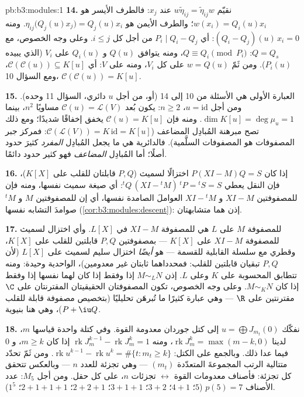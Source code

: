 \begin{solution}{pb:b3:modules:1}
\textbf{14.} نقيّم $w\tilde\eta_{ij} = \tilde\eta_{ij}w$ عند $x_j$: فالطرف الأيسر هو $w(x_i) = Q_i(u)x_i$؛
والطرف الأيمن هو $\eta_{ij}\bigl(Q_j(u)x_j\bigr) = Q_j(u)x_i$. ومنه $(Q_i -
Q_j)(u)\,x_i = 0$: أي $P_i \mid Q_i - Q_j$ من أجل كل
$i \leq j$. وعلى وجه الخصوص، مع $Q = Q_s$: $Q \equiv Q_i \pmod{P_i}$، ومنه
يتوافق $Q(u)$ و $Q_i(u)$ على $V_i$ (الذي يبيده $P_i(u)$).
ومن ثَمّ $w
= Q(u)$ على كل $V_i$، ومنه على $V$: أي $\mathcal C(\mathcal C(u))
\subseteq K[u]$، ومع
السؤال 10، $\mathcal C(\mathcal
C(u)) = K[u]$.

\textbf{15.} العبارة الأولى هي الأسئلة من 10 إلى 14 (أو، من أجل
$u$ دائري، السؤال 11 وحده). ومن أجل $u = \mathrm{id}$، $n \geq
2$: يكون
بُعد $\mathcal C(u) = \mathcal L(V)$ مساويًا $n^2$، بينما $\dim K[u] = \deg\mu_u = 1$. ومنه فإن $\mathcal C(u) = K[u]$
يخفق إخفاقًا شديدًا؛ ومع ذلك تصح مبرهنة المُبادِل المضاعف
($\mathcal C(\mathcal L(V)) = K\,\mathrm{id} = K[u]$: فمركز جبر المصفوفات هو المصفوفات السلَّمية). فالدائرية
هي ما يجعل المُبادِل \emph{المفرد} كثيرَ حدود أصلًا؛ أما
المُبادِل \emph{المضاعف} فهو كثير حدود دائمًا.

\textbf{16.} إذا كان $P(XI - M)Q = S$ اختزالًا لسميث ($P, Q$
قابلتان للقلب على $K[X]$)، فإن النقل يعطي ${}^tQ\,(XI -
{}^tM)\,{}^tP = {}^tS = S$: أي صيغة سميث
نفسها، ومنه فإن للمصفوفتين $XI - M$ و $XI - {}^tM$ العواملَ
الصامدة نفسها، أي إن للمصفوفتين $M$ و ${}^tM$ صوامدَ التشابه
نفسها (\cref{cor:b3:modules:descent}): إذن هما متشابهتان.

\textbf{17.}  للمصفوفة $M$ على $L$ هي  للمصفوفة $XI - M$ في $L[X]$. وأي اختزال لسميث للمصفوفة
$XI - M$ على $K[X]$ --- بمصفوفتين $P, Q$ قابلتين للقلب على
$K[X]$، وقطري مع سلسلة القابلية للقسمة --- هو \emph{أيضًا}
اختزال سليم لسميث على $L[X]$ (لأن $P, Q$ تبقيان قابلتين للقلب:
فمحدداهما ثابتان غير معدومين)،  الواحدية وحيدة:
ومنه تتطابق  المحسوبة على $K$ وعلى $L$. إذن
$M \sim_L N$ إذا وفقط إذا كان لهما  نفسها إذا
وفقط إذا كان $M \sim_K N$. وعلى وجه الخصوص، تكون المصفوفتان
الحقيقيتان المقترنتان على $\C$ مقترنتين على $\R$ --- وهي عبارة
كثيرًا ما تُبرهَن تحليليًا (بتخصيص مصفوفة قابلة للقلب $P + \iu
Q$)،
وهي هنا بنيوية.

\textbf{18.} نفكّك $u = \bigoplus J_{m_t}(0)$ إلى كتل جوردان معدومة القوة. وفي كتلة
واحدة قياسها $m$، لدينا $\operatorname{rk}J_m^k = \max(m - k, 0)$، ومنه $\operatorname{rk}J_m^{k-1} - \operatorname{rk}J_m^k = 1$ إذا كان $m
\geq k$،
و $0$ فيما عدا ذلك. وبالجمع على الكتل: $\operatorname{rk}u^{k-1} - \operatorname{rk}u^k =
\#\{t : m_t \geq k\}$. ومن ثَمّ تحدّد
متتالية الرتب المجموعةَ المتعدّدة $(m_t)$ --- وهي تجزئة للعدد
$n$ --- وبالعكس تتحقق كل تجزئة: فأصناف معدومات القوة $\leftrightarrow$
تجزئات $n$، على كل حقل. ومن أجل $M_5$: عدد الأصناف $p(5) = 7$
($5$؛ $4{+}1$؛ $3{+}2$؛ $3{+}1{+}1$؛ $2{+}2{+}1$؛
$2{+}1{+}1{+}1$؛ $1^5$).


\end{solution}
